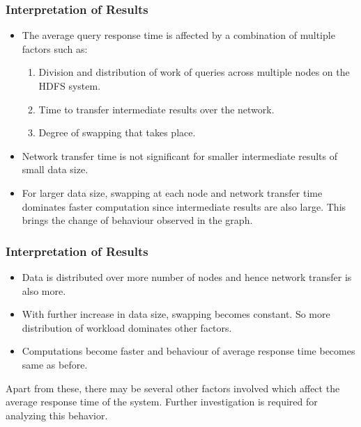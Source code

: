 \documentclass[12pt,xcolor=dvipsnames]{beamer}
\begin{document}
\begin{frame}[t]
\frametitle{Interpretation of Results}
\begin{itemize}
 \item The average query response time is affected by a combination of multiple factors such as:
\begin{enumerate}
 \item Division and distribution of work of queries across multiple nodes on the HDFS system.
 \item Time to transfer intermediate results over the network.
 \item Degree of swapping that takes place.
\end{enumerate}
\item Network transfer time is not significant for smaller intermediate results of small data size.
\item For larger data size, swapping at each node and network transfer time dominates faster computation 
    since intermediate results are also large. This brings the change of behaviour observed in the graph.
\end{itemize}

\end{frame}

\begin{frame}[t]
\frametitle{Interpretation of Results}
\begin{itemize}
\item Data is distributed over more number of nodes and hence network transfer is also more.
\item With further increase in data size, swapping becomes constant. So more distribution of workload dominates other factors.
\item Computations become faster and behaviour of average response time becomes same as before.
\newline
\end{itemize}
Apart from these, there may be several other factors involved which affect the average response time of the system. 
Further investigation is required for analyzing this behavior.
\end{frame}
\end{document}
